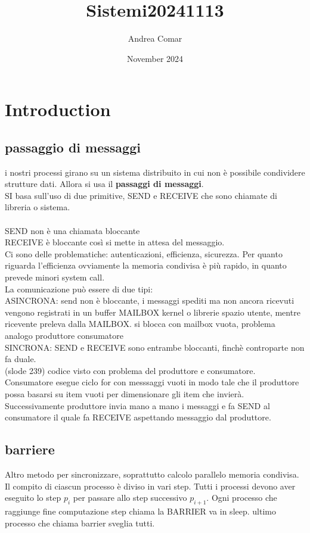 \documentclass{article}
\title{Sistemi20241113}
\author{Andrea Comar}
\date{November 2024}
\begin{document}
\maketitle

\section{Introduction}

\subsection{passaggio di messaggi}
i nostri processi girano su un sistema distribuito in cui non è possibile condividere strutture dati. Allora si usa il \textbf{passaggi di messaggi}.\\
SI basa sull'uso di due primitive, SEND e RECEIVE che sono chiamate di libreria o sistema.
\\ 
\\
SEND non è una chiamata bloccante\\
RECEIVE è bloccante così si mette in attesa del messaggio.\\
Ci sono delle problematiche: autenticazioni, efficienza, sicurezza. Per quanto riguarda l'efficienza ovviamente la memoria condivisa è più rapido, in quanto prevede minori system call.\\
La comunicazione può essere di due tipi:\\
ASINCRONA: send non è bloccante, i messaggi spediti ma non ancora ricevuti vengono registrati in un buffer MAILBOX kernel o librerie spazio utente, mentre ricevente preleva dalla MAILBOX. si blocca con mailbox vuota, problema analogo produttore consumatore
\\SINCRONA: SEND e RECEIVE sono entrambe bloccanti, finchè controparte non fa duale.\\
(slode 239)
codice visto con problema del produttore e consumatore.\\
Consumatore esegue ciclo for con messsaggi vuoti in modo tale che il produttore possa basarsi su item vuoti per dimensionare gli item che invierà.\\
Successivamente produttore invia mano a mano i messaggi e fa SEND al consumatore il quale fa RECEIVE aspettando messaggio dal produttore.
\subsection{barriere}
Altro metodo per sincronizzare, soprattutto calcolo parallelo memoria condivisa.
Il compito di ciascun processo è diviso in vari step. Tutti i processi devono aver eseguito lo step $p_i$ per passare allo step successivo $p_{i+1}$. Ogni processo che raggiunge fine computazione step chiama la BARRIER  va in sleep. ultimo processo che chiama barrier sveglia tutti.
\end{document}
